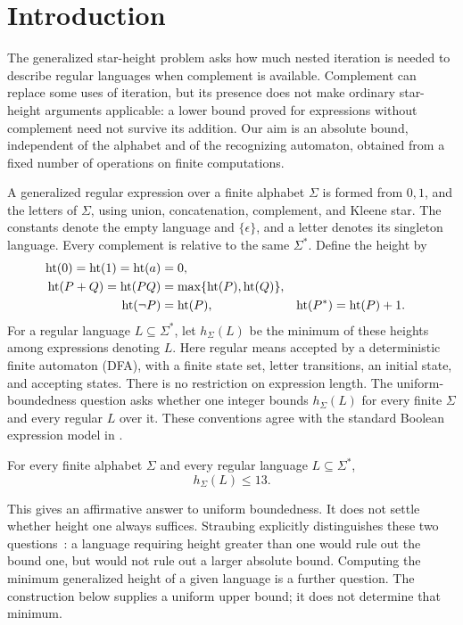 \section{Introduction}\label{sec:introduction}

The generalized star-height problem asks how much nested iteration is
needed to describe regular languages when complement is available.
Complement can replace some uses of iteration, but its presence does not
make ordinary star-height arguments applicable: a lower bound proved for
expressions without complement need not survive its addition. Our aim is
an absolute bound, independent of the alphabet and of the recognizing
automaton, obtained from a fixed number of operations on finite computations.

A generalized regular expression over a finite alphabet \(\Sigma\) is formed
from \(0,1\), and the letters of \(\Sigma\), using union, concatenation,
complement, and Kleene star. The constants denote the empty language and
\(\{\epsilon\}\), and a letter denotes its singleton language. Every
complement is relative to the same \(\Sigma^*\). Define the height by
\[
\begin{aligned}
 \operatorname{ht}(0)=\operatorname{ht}(1)=\operatorname{ht}(a)&=0,\\
 \operatorname{ht}(P+Q)=\operatorname{ht}(PQ)&=\max\{\operatorname{ht}(P),\operatorname{ht}(Q)\},\\
 \operatorname{ht}(\neg P)&=\operatorname{ht}(P),&
 \operatorname{ht}(P^*)&=\operatorname{ht}(P)+1.
\end{aligned}
\]
For a regular language \(L\subseteq\Sigma^*\), let \(h_\Sigma(L)\) be the
minimum of these heights among expressions denoting \(L\). Here regular
means accepted by a deterministic finite automaton (DFA), with a finite
state set, letter transitions, an initial state, and accepting states.
There is no restriction on expression length. The uniform-boundedness question asks
whether one integer bounds \(h_\Sigma(L)\) for every finite \(\Sigma\) and
every regular \(L\) over it. These conventions agree with the standard
Boolean expression model in \cite[\S1]{PST1992}.

\begin{theorem}\label{thm:main}
For every finite alphabet \(\Sigma\) and every regular language
\(L\subseteq\Sigma^*\),
\[
                         h_\Sigma(L)\le 13.
\]
\end{theorem}

This gives an affirmative answer to uniform boundedness. It does not settle
whether height one always suffices. Straubing explicitly distinguishes
these two questions~\cite[p.~537]{Straubing2002}: a language requiring
height greater than one would rule out the bound one, but would not rule
out a larger absolute bound. Computing the minimum generalized height of
a given language is a further question. The construction below supplies
a uniform upper bound; it does not determine that minimum.

